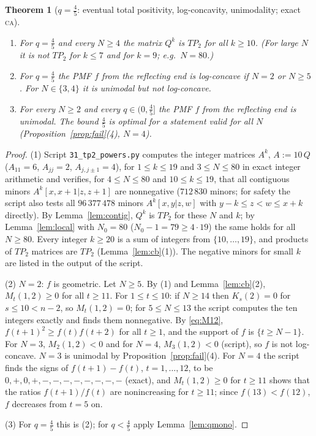 \documentclass[11pt,a4paper]{article}
\newtheorem{theorem}{Theorem}[section]
\theoremstyle{definition}
\theoremstyle{remark}
\newcommand{\CA}{\textsc{ca}}
\begin{document}
\begin{theorem}[$q=\frac45$: eventual total positivity, log-concavity, unimodality; exact \CA]\label{thm:tp2}
\begin{enumerate}
\item For $q=\frac45$ and every $N\ge4$ the matrix $Q^k$ is $TP_2$ for all $k\ge10$. (For large $N$ it is not $TP_2$ for $k\le7$ and for $k=9$; e.g.\ $N=80$.)
\item For $q=\frac45$ the PMF $f$ from the reflecting end is log-concave if $N=2$ or $N\ge5$. For $N\in\{3,4\}$ it is
unimodal but not log-concave.
\item For every $N\ge2$ and every $q\in(0,\frac45]$ the PMF $f$ from the reflecting end is unimodal. The bound
$\frac45$ is optimal for a statement valid for all $N$ (Proposition~\ref{prop:fail}(4), $N=4$).
\end{enumerate}
\end{theorem}
\begin{proof}
(1) Script \texttt{31\_tp2\_powers.py} computes the integer matrices $A^k$, $A:=10\,Q$ ($A_{11}=6$, $A_{jj}=2$,
$A_{j,j\pm1}=4$), for $1\le k\le19$ and $3\le N\le80$ in exact integer arithmetic and verifies, for $4\le N\le80$
and $10\le k\le19$, that all contiguous minors $A^k[x,x+1|z,z+1]$ are nonnegative ($712\,830$ minors; for
safety the script also tests all $96\,377\,478$ minors $A^k[x,y|z,w]$ with $y-k\le z<w\le x+k$ directly). By
Lemma~\ref{lem:contig}, $Q^k$ is $TP_2$ for these $N$ and $k$; by Lemma~\ref{lem:local} with $N_0=80$
($N_0-1=79\ge4\cdot19$) the same holds for all $N\ge80$. Every integer $k\ge20$ is a sum of integers from
$\{10,\dots,19\}$, and products of $TP_2$ matrices are $TP_2$ (Lemma~\ref{lem:cb}(1)). The negative minors for small $k$
are listed in the output of the script.

(2) $N=2$: $f$ is geometric. Let $N\ge5$. By (1) and Lemma~\ref{lem:cb}(2), $M_t(1,2)\ge0$ for all $t\ge11$. For
$1\le t\le10$: if $N\ge14$ then $K_s(2)=0$ for $s\le10<n-2$, so $M_t(1,2)=0$; for $5\le N\le13$ the script computes the
ten integers exactly and finds them nonnegative. By \eqref{eq:M12}, $f(t+1)^2\ge f(t)f(t+2)$ for all $t\ge1$, and
the support of $f$ is $\{t\ge N-1\}$. For $N=3$, $M_2(1,2)<0$ and for $N=4$, $M_3(1,2)<0$ (script), so $f$ is not
log-concave. $N=3$ is unimodal by Proposition~\ref{prop:fail}(4). For $N=4$ the script finds the signs of
$f(t+1)-f(t)$, $t=1,\dots,12$, to be $0,+,0,+,-,-,-,-,-,-,-,-$ (exact), and $M_t(1,2)\ge0$ for $t\ge11$ shows that
the ratios $f(t+1)/f(t)$ are nonincreasing for $t\ge11$; since $f(13)<f(12)$, $f$ decreases from $t=5$ on.

(3) For $q=\frac45$ this is (2); for $q<\frac45$ apply Lemma~\ref{lem:qmono}.
\end{proof}
\end{document}
